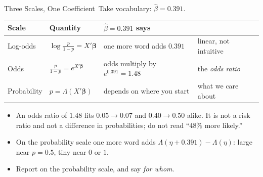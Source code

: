 \documentclass[aspectratio=169,11pt,xcolor=dvipsnames]{beamer}
\newcommand{\core}{\,\raisebox{0.6pt}{\textcolor{corestar}{$\bigstar$}}}
\begin{document}
\begin{frame}{Three Scales, One Coefficient\core}
Take vocabulary: $\hat\beta = 0.391$.
\begin{center}\small
\renewcommand{\arraystretch}{1.35}
\begin{tabular}{llll}
\toprule
Scale & Quantity & $\hat\beta = 0.391$ says & \\
\midrule
Log-odds & $\log\frac{p}{1-p} = X'\bm\beta$ & one more word adds $0.391$ & linear, not intuitive \\
Odds & $\frac{p}{1-p} = e^{X'\bm\beta}$ & odds multiply by $e^{0.391} = 1.48$ & the \emph{odds ratio} \\
Probability & $p = \Lambda(X'\bm\beta)$ & depends on where you start & \alert{what we care about} \\
\bottomrule
\end{tabular}
\end{center}
\vskip4pt
\begin{itemize}\itemsep3pt
  \item An odds ratio of $1.48$ fits $0.05 \to 0.07$ and $0.40 \to 0.50$
        alike. \alert{It is not a risk ratio and not a difference in
        probabilities}; do not read ``$48\%$ more likely.''
  \item On the probability scale one more word adds
        $\Lambda(\eta + 0.391) - \Lambda(\eta)$: large near $p = 0.5$,
        tiny near $0$ or $1$.
  \item Report on the probability scale, and say \emph{for whom}.
\end{itemize}
\end{frame}
\end{document}
